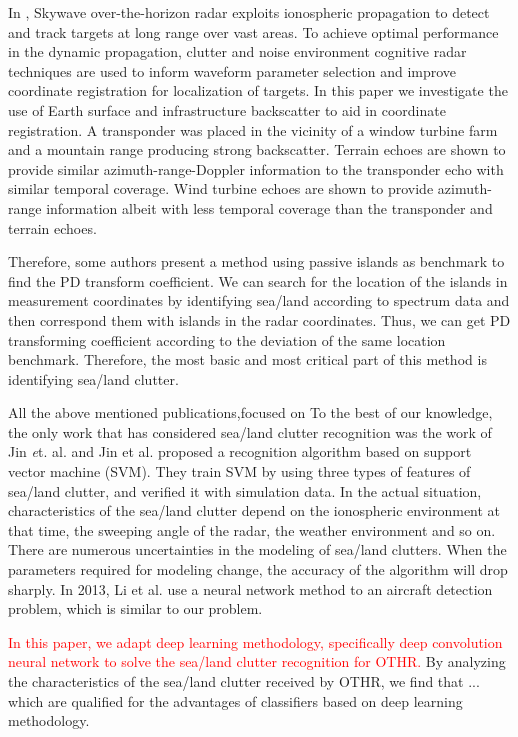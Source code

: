 In \cite{holdsworth2017skywave}, Skywave over-the-horizon radar exploits ionospheric propagation to detect and track targets at long range over vast areas. To achieve optimal performance in the dynamic propagation, clutter and noise environment cognitive radar techniques are used to inform waveform parameter selection and improve coordinate registration for localization of targets. In this paper we investigate the use of Earth surface and infrastructure backscatter to aid in coordinate registration. A transponder was placed in the vicinity of a window turbine farm and a mountain range producing strong backscatter. Terrain echoes are shown to provide similar azimuth-range-Doppler information to the transponder echo with similar temporal coverage. Wind turbine echoes are shown to provide azimuth-range information albeit with less temporal coverage than the transponder and terrain echoes.




Therefore, some authors present a method using passive islands as benchmark to find the PD transform coefficient\cite{cuccoli2011coordinate}. We can search for the location of the islands in measurement coordinates by identifying sea/land according to spectrum data and then correspond them with islands in the radar coordinates. Thus, we can get PD transforming coefficient according to the deviation of the same location benchmark. Therefore, the most basic and most critical part of this method is identifying sea/land clutter.

All the above mentioned publications,focused on To the best of our knowledge, the only work that has considered sea/land clutter recognition was the work of Jin {\emph et. al.} \cite{jin2012svm} and Jin et al. \cite{jin2012svm} proposed a recognition algorithm based on support vector machine (SVM). They train SVM by using three types of features of sea/land clutter, and verified it with simulation data. In the actual situation, characteristics of the sea/land clutter depend on the ionospheric environment at that time, the sweeping angle of the radar, the weather environment and so on. There are numerous uncertainties in the modeling of sea/land clutters. When the parameters required for modeling change, the accuracy of the algorithm will drop sharply. In 2013, Li et al. \cite{li2013high} use a neural network method to an aircraft detection problem, which is similar to our problem.


\textcolor{red}{In this paper, we adapt deep learning methodology, specifically deep convolution neural network to solve the
	sea/land clutter recognition for OTHR.}
By analyzing the characteristics of the sea/land clutter received by OTHR, we find that ...
which are qualified for the advantages of classifiers based on deep learning methodology.


